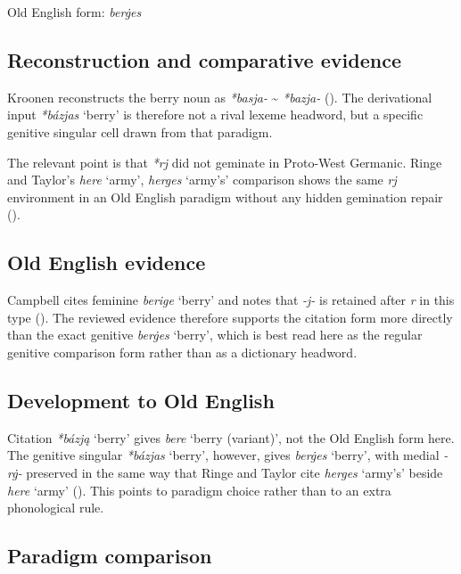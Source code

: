\documentclass[
  british,
  a4paper,
  openany]{book}
\providecommand{\Recon}[1]{\emph{*#1}}
{\catcode`→=\active \global\def→{\ensuremath{\rightarrow}}}
\providecommand{\Recon}[1]{\emph{*#1}}
{\catcode`→=\active \global\def→{\ensuremath{\rightarrow}}}
\begin{document}
Old English form: \emph{berġes}

\subsection{Reconstruction and comparative
evidence}\label{reconstruction-and-comparative-evidence-109}

Kroonen reconstructs the berry noun as {\emph{*basja-}}
\textasciitilde{} {\emph{*bazja-}} (). The derivational input {\Recon{bázjas} `berry'} is therefore
not a rival lexeme headword, but a specific genitive singular cell drawn
from that paradigm.

The relevant point is that \emph{*rj} did not geminate in Proto-West
Germanic. Ringe and Taylor's {\emph{here}} `army', {\emph{herges}}
`army's' comparison shows the same \emph{rj} environment in an Old
English paradigm without any hidden gemination repair
().

\subsection{Old English evidence}\label{old-english-evidence-109}

Campbell cites feminine {\emph{berige}} `berry' and notes that
\emph{-j-} is retained after \emph{r} in this type
(). The reviewed evidence
therefore supports the citation form more directly than the exact
genitive {\emph{berġes}} `berry', which is best read here as the regular
genitive comparison form rather than as a dictionary headword.

\subsection{Development to Old
English}\label{development-to-old-english-109}

Citation {\Recon{bázją} `berry'} gives {\emph{bere}} `berry (variant)',
not the Old English form here. The genitive singular {\Recon{bázjas}
`berry'}, however, gives {\emph{berġes}} `berry', with medial
\emph{-rġ-} preserved in the same way that Ringe and Taylor cite
{\emph{herges}} `army's' beside {\emph{here}} `army'
(). This
points to paradigm choice rather than to an extra phonological rule.

\subsection{Paradigm comparison}\label{paradigm-comparison-1}
\end{document}
